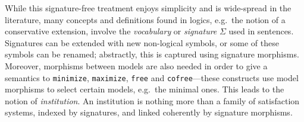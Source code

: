 \documentclass[10pt,fleqn,final]{scrreprt}
\newcommand*{\syntax}[1]{\texttt{#1}}
\newenvironment{definitions}[0]{\medskip }{}
\begin{document}
\begin{definitions}

While this signature-free treatment enjoys simplicity and is wide-spread in the literature, many 
concepts and definitions found in logics, e.g.\ the notion of a conservative extension, involve the
\emph{vocabulary} or \emph{signature} $\Sigma$ \label{vocabulary} used in sentences.  Signatures 
can be extended with new non-logical symbols, or some of these symbols can be renamed; abstractly, 
this is captured using signature morphisms. Moreover,  morphisms
between models are also needed in order to give a semantics to \syntax{minimize},
\syntax{maximize}, \syntax{free} and \syntax{cofree}---these constructs
use model morphisms to select certain models, e.g.\ the minimal ones.
This leads to the notion of \emph{institution}. An institution
is nothing more than a family of satisfaction systems, indexed by
signatures, and linked coherently by signature morphisms.



\end{definitions}
\end{document}
